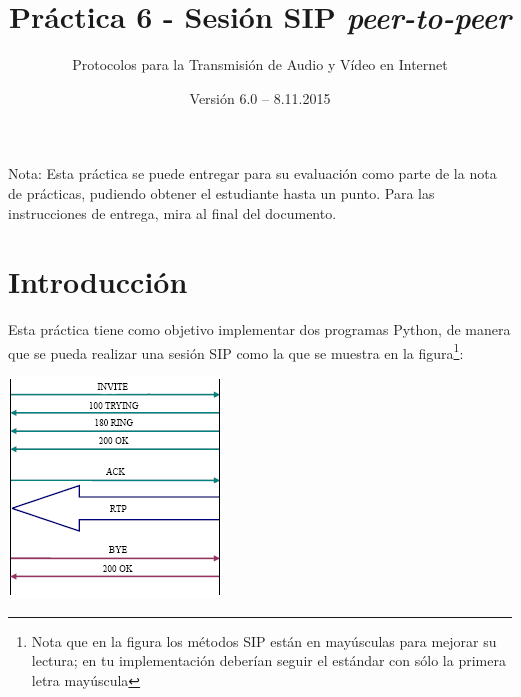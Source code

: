 \documentclass[a4paper,11pt]{article}
\begin{document}
\title{Práctica 6 - Sesión SIP \emph{peer-to-peer}}
\author{Protocolos para la Transmisión de Audio y Vídeo en Internet}
\date{Versión 6.0 – 8.11.2015}



\maketitle
\thispagestyle{empty}



Nota: Esta práctica se puede entregar para su evaluación como parte de la nota de prácticas, pudiendo obtener el estudiante hasta un punto. Para las instrucciones de entrega, mira al final del documento.

\section*{Introducción}

Esta práctica tiene como objetivo implementar dos programas Python,
de manera que se pueda realizar una sesión SIP como la que se
muestra en la figura\footnote{Nota que en la figura los métodos SIP están en 
mayúsculas para mejorar su lectura; en tu implementación deberían seguir el 
estándar con sólo la primera letra mayúscula}:

\begin{center}
\includegraphics{figs/sip-invite.png}
\end{center}
\end{document}
